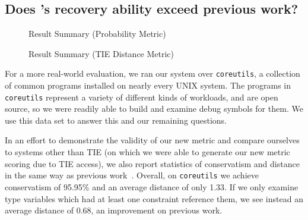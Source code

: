 \subsection{Does \bitr's recovery ability exceed previous work?}
\label{subsec:evalprev}
\begin{figure}
\caption{Result Summary (Probability Metric)}
\label{bitr:fig:results-prob}
\end{figure}
\begin{figure}
\caption{Result Summary (TIE Distance Metric)}
\label{bitr:fig:results-tie}
\end{figure}

For a more real-world evaluation, we ran our system over \texttt{coreutils}, a collection of common programs installed on nearly every UNIX system. The programs in \texttt{coreutils} represent a variety of different kinds of workloads, and are open source, so we were readily able to build and examine debug symbols for them. We use this data set to answer this and our remaining questions.

In an effort to demonstrate the validity of our new metric and compare ourselves to systems other than TIE (on which we were able to generate our new metric scoring due to TIE access), we also report statistics of conservatism and distance in the same way as previous work~\cite{tie,sw}. Overall, on \texttt{coreutils} we achieve conservatism of 95.95\% and an average distance of only 1.33. If we only examine type variables which had at least one constraint reference them, we see instead an average distance of 0.68, an improvement on previous work.

